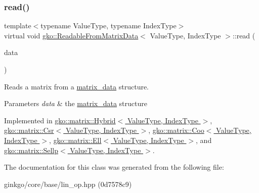 \subsubsection{\texorpdfstring{read()}{read()}}
{\footnotesize\ttfamily template$<$typename Value\+Type, typename Index\+Type$>$ \\
virtual void \hyperlink{classgko_1_1ReadableFromMatrixData}{gko\+::\+Readable\+From\+Matrix\+Data}$<$ Value\+Type, Index\+Type $>$\+::read (\begin{DoxyParamCaption}\item[{const \hyperlink{structgko_1_1matrix__data}{matrix\+\_\+data}$<$ Value\+Type, Index\+Type $>$ \&}]{data }\end{DoxyParamCaption})\hspace{0.3cm}{\ttfamily [pure virtual]}}



Reads a matrix from a \hyperlink{structgko_1_1matrix__data}{matrix\+\_\+data} structure. 


\begin{DoxyParams}{Parameters}
{\em data} & the \hyperlink{structgko_1_1matrix__data}{matrix\+\_\+data} structure \\
\hline
\end{DoxyParams}


Implemented in \hyperlink{classgko_1_1matrix_1_1Hybrid_a7eff2922ae21e9722b343ca1832d8bf5}{gko\+::matrix\+::\+Hybrid$<$ Value\+Type, Index\+Type $>$}, \hyperlink{classgko_1_1matrix_1_1Csr_ac4db41146ed3c3a8653b03d6b2c6c675}{gko\+::matrix\+::\+Csr$<$ Value\+Type, Index\+Type $>$}, \hyperlink{classgko_1_1matrix_1_1Coo_ac0d4aeb19d9f55b62bea18bad1a408f5}{gko\+::matrix\+::\+Coo$<$ Value\+Type, Index\+Type $>$}, \hyperlink{classgko_1_1matrix_1_1Ell_a2c877d9f7bbc57f97df5ab443954a6fd}{gko\+::matrix\+::\+Ell$<$ Value\+Type, Index\+Type $>$}, and \hyperlink{classgko_1_1matrix_1_1Sellp_a2c5ff4a3f190daf7d70bbd8451d13edd}{gko\+::matrix\+::\+Sellp$<$ Value\+Type, Index\+Type $>$}.



The documentation for this class was generated from the following file\+:\begin{DoxyCompactItemize}
\item 
ginkgo/core/base/lin\+\_\+op.\+hpp (0d7578c9)\end{DoxyCompactItemize}
